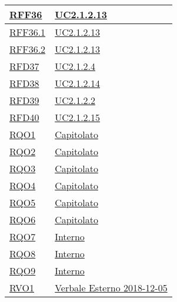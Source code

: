 \begin{longtable}{|>{\centering}m{5cm}|m{5cm}<{\centering}|}
	\hyperlink{RFF36}{RFF36} & \hyperref[UC2.1.2.13]{UC2.1.2.13}\\ \hline
	
	\hyperlink{RFF36.1}{RFF36.1} & \hyperref[UC2.1.2.13]{UC2.1.2.13}\\ \hline
	
	\hyperlink{RFF36.2}{RFF36.2} & \hyperref[UC2.1.2.13]{UC2.1.2.13}\\ \hline
	
	\hyperlink{RFD37}{RFD37} & \hyperref[UC2.1.2.4]{UC2.1.2.4}\\ \hline
	
	\hyperlink{RFD38}{RFD38} & \hyperref[UC2.1.2.14]{UC2.1.2.14}\\ \hline
	
	\hyperlink{RFD39}{RFD39} & \hyperref[UC2.1.2.2]{UC2.1.2.2}\\ \hline
	
	\hyperlink{RFD40}{RFD40} & \hyperref[UC2.1.2.15]{UC2.1.2.15}\\ \hline
		
	\hyperlink{RQO1}{RQO1} & \hyperref[Capitolato]{Capitolato}\\ \hline
	
	\hyperlink{RQO2}{RQO2} & \hyperref[Capitolato]{Capitolato}\\ \hline
	
	\hyperlink{RQO3}{RQO3} & \hyperref[Capitolato]{Capitolato}\\ \hline
	
	\hyperlink{RQO4}{RQO4} & \hyperref[Capitolato]{Capitolato}\\ \hline
	
	\hyperlink{RQO5}{RQO5} & \hyperref[Capitolato]{Capitolato}\\ \hline
	
	\hyperlink{RQO6}{RQO6} & \hyperref[Capitolato]{Capitolato}\\ \hline
	
	\hyperlink{RQO7}{RQO7} & \hyperref[Interno]{Interno}\\ \hline
	
	\hyperlink{RQO8}{RQO8} & \hyperref[Interno]{Interno}\\ \hline
	
	\hyperlink{RQO9}{RQO9} & \hyperref[Interno]{Interno}\\ \hline
	
	\hyperlink{RVO1}{RVO1} & \hyperref[Verbale Esterno 2018-12-05]{Verbale Esterno 2018-12-05}\\ \hline
	

\end{longtable}
